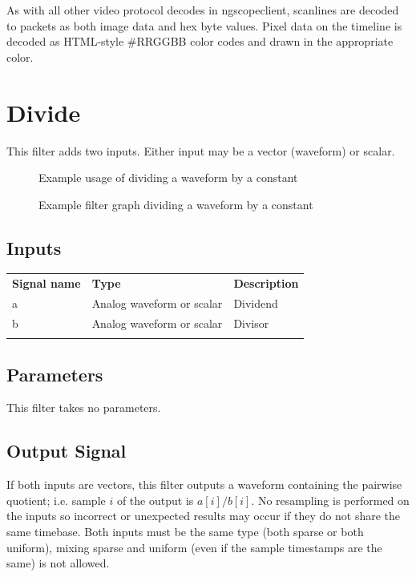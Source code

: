 As with all other video protocol decodes in ngscopeclient, scanlines are decoded to packets as both image data and hex
byte values. Pixel data on the timeline is decoded as HTML-style \#RRGGBB color codes and drawn in the appropriate
color.

\pagebreak
\section{Divide}
\label{filter:divide}

This filter adds two inputs. Either input may be a vector (waveform) or scalar.

\begin{figure}[h]
\centering
{}
\caption{Example usage of dividing a waveform by a constant}
\label{filter_add}
\end{figure}

\begin{figure}[h]
\centering
{}
\caption{Example filter graph dividing a waveform by a constant}
\label{filter_graph_add}
\end{figure}
\FloatBarrier
\subsection{Inputs}

\begin{tabularx}{16cm}{llX}
\thickhline
\textbf{Signal name} & \textbf{Type} & \textbf{Description} \\
\thickhline
a & Analog waveform or scalar & Dividend\\
\thinhline
b & Analog waveform or scalar & Divisor\\
\thickhline
\end{tabularx}

\subsection{Parameters}

This filter takes no parameters.

\subsection{Output Signal}

If both inputs are vectors, this filter outputs a waveform containing the pairwise quotient; i.e. sample $i$ of the output
is $a[i] / b[i]$. No resampling is performed on the inputs so incorrect or unexpected results may occur if they do not
share the same timebase. Both inputs must be the same type (both sparse or both uniform), mixing sparse and uniform
(even if the sample timestamps are the same) is not allowed.

